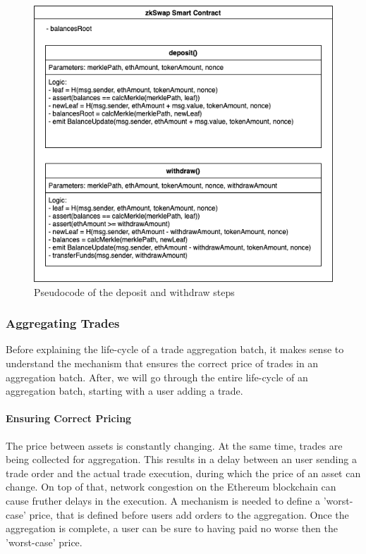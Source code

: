 \documentclass[../../thesis.tex]{subfiles}
\begin{document}
\begin{figure}[h]
    \centerline{\includegraphics[totalheight=8cm]{diagrams/deposit.png}}
    \caption{Pseudocode of the deposit and withdraw steps}
    \label{fig:dep_with}
\end{figure}

\subsubsection{Aggregating Trades}
Before explaining the life-cycle of a trade aggregation batch, it makes sense to understand the mechanism that ensures the correct price of trades in an aggregation batch. After, we will go through the entire life-cycle of an aggregation batch, starting with a user adding a trade. 

\paragraph{Ensuring Correct Pricing}
The price between assets is constantly changing. At the same time, trades are being collected for aggregation. This results in a delay between an user sending a trade order and the actual trade execution, during which the price of an asset can change. On top of that, network congestion on the Ethereum blockchain can cause fruther delays in the execution. A mechanism is needed to define a 'worst-case' price, that is defined before users add orders to the aggregation. Once the aggregation is complete, a user can be sure to having paid no worse then the 'worst-case' price.
\end{document}
